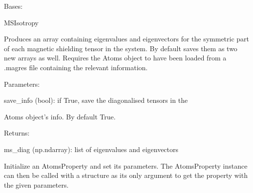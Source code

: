 \documentclass[letterpaper,10pt,english]{sphinxmanual}
\begin{document}
\begin{fulllineitems}
\label{doctree/soprano.properties.nmr.nmr:soprano.properties.nmr.nmr.MSDiagonal}
Bases: {\hyperref[doctree/soprano.properties.atomsproperty:soprano.properties.atomsproperty.AtomsProperty]{\emph{}}}

MSIsotropy

Produces an array containing eigenvalues and eigenvectors for the
symmetric part of each magnetic shielding tensor in the system. By default
saves them as two new arrays as well.
Requires the Atoms object to have been loaded from a .magres file
containing the relevant information.

\begin{DUlineblock}{0em}
\item[] Parameters:
\item[]
\begin{DUlineblock}{\DUlineblockindent}
\item[] save\_info (bool): if True, save the diagonalised tensors in the
\item[]
\begin{DUlineblock}{\DUlineblockindent}
\item[] Atoms object's info. By default True.
\end{DUlineblock}
\end{DUlineblock}
\end{DUlineblock}

\begin{DUlineblock}{0em}
\item[] Returns:
\item[]
\begin{DUlineblock}{\DUlineblockindent}
\item[] ms\_diag (np.ndarray): list of eigenvalues and eigenvectors
\end{DUlineblock}
\end{DUlineblock}

Initialize an AtomsProperty and set its parameters.
The AtomsProperty instance can then be called with a structure as its
only argument to get the property with the given parameters.


\end{fulllineitems}
\end{document}
